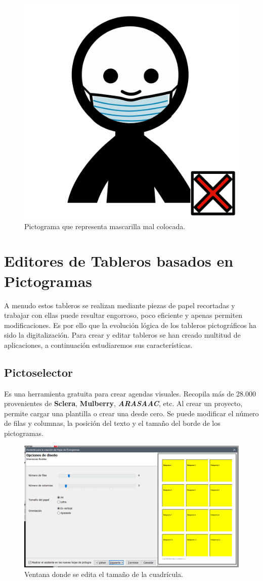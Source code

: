 \begin{figure}[h!]
	\centering
	\includegraphics[width=0.2\linewidth]{Imagenes/Bitmap/Mascarilla mal colocada}
	\caption{Pictograma que representa mascarilla mal colocada.}
	\label{fig:picto-mascarilla-mal-colocada}
\end{figure}

\section{Editores de Tableros basados en Pictogramas}

A menudo estos tableros se realizan mediante piezas de papel recortadas y trabajar con ellas puede resultar engorroso, poco eficiente y apenas permiten modificaciones. Es por ello que la evolución lógica de los tableros pictográficos ha sido la digitalización. Para crear y editar tableros se han creado multitud de aplicaciones, a continuación estudiaremos sus características.

\subsection{Pictoselector}
Es una herramienta gratuita para crear agendas visuales. Recopila más de 28.000 provenientes de \textbf{Sclera}, \textbf{Mulberry}, \textbf{\textit{ARASAAC}}, etc. Al crear un proyecto, permite cargar una plantilla o crear una desde cero. Se puede modificar el número de filas y columnas, la posición del texto y el tamaño del borde de los pictogramas.
\begin{figure}[h!]
	\centering
	\includegraphics[width=0.7\linewidth]{Imagenes/Bitmap/Pictoselector Tablero}
	\caption{Ventana donde se edita el tamaño de la cuadrícula.}
	\label{fig:pictoselector-tablero}
\end{figure}


